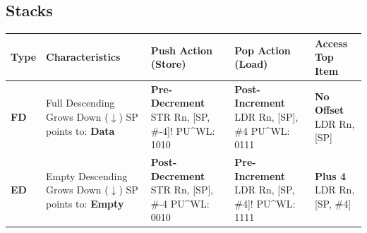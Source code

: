 \documentclass[../comorg-part1.tex]{subfiles}
\begin{document}
\newpage

\begin{landscape}

\subsection{Stacks}

\vspace*{1em} 

\begin{center}
    \begin{minipage}{\linewidth}
        \centering
        \small %
        \renewcommand{\arraystretch}{1.8} 
        \setlength{\tabcolsep}{6pt}   
        
        \begin{tabular}{|l|>{\centering\arraybackslash}p{3.5cm}|>{\centering\arraybackslash}p{4cm}|>{\centering\arraybackslash}p{4cm}|>{\centering\arraybackslash}p{3.5cm}|}
        \hline
        \rowcolor{headergray} 
        \textbf{Type} & \textbf{Characteristics} & \textbf{Push Action (Store)} & \textbf{Pop Action (Load)} & \textbf{Access Top Item} \\ 
        \hline
        
        \textbf{FD} & 
        Full Descending \newline Grows Down ($\downarrow$) \newline SP points to: \textbf{Data} & 
        \textbf{Pre-Decrement} \newline \ttfamily STR Rn, [SP, \#-4]! \newline PU\^{}WL: 1010 & 
        \textbf{Post-Increment} \newline \ttfamily LDR Rn, [SP], \#4 \newline PU\^{}WL: 0111 &
        \textbf{No Offset} \newline \ttfamily LDR Rn, [SP] \\ 
        \hline

        \textbf{ED} & 
        Empty Descending \newline Grows Down ($\downarrow$) \newline SP points to: \textbf{Empty} & 
        \textbf{Post-Decrement} \newline \ttfamily STR Rn, [SP], \#-4 \newline PU\^{}WL: 0010 & 
        \textbf{Pre-Increment} \newline \ttfamily LDR Rn, [SP, \#4]! \newline PU\^{}WL: 1111 &
        \textbf{Plus 4} \newline \ttfamily LDR Rn, [SP, \#4] \\ 
        \hline


\end{tabular}
\end{minipage}
\end{center}
\end{landscape}
\end{document}
